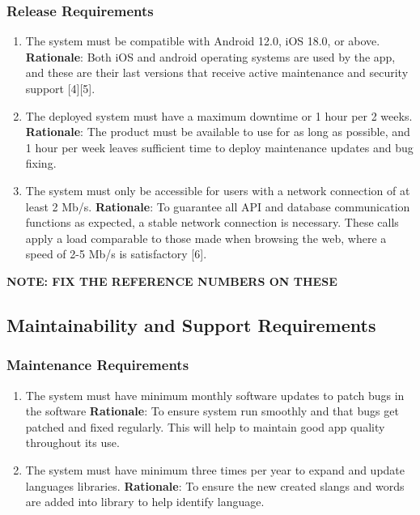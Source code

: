 \subsubsection{Release Requirements}
\label{ssub:release_requirements}
\begin{enumerate}[{OE-R}1. ]
	\item The system must be compatible with Android 12.0, iOS 18.0, or above.
	\textbf{Rationale}: Both iOS and android operating systems are used by the app, and these are their last versions that receive active maintenance and security support [4][5]. 
	\item The deployed system must have a maximum downtime or 1 hour per 2 weeks.
	\textbf{Rationale}: The product must be available to use for as long as possible, and 1 hour per week leaves sufficient time to deploy maintenance updates and bug fixing.
	\item The system must only be accessible for users with a network connection of at least 2 Mb/s.
	\textbf{Rationale}: To guarantee all API and database communication functions as expected, a stable network connection is necessary. These calls apply a load comparable to those made when browsing the web, where a speed of 2-5 Mb/s is satisfactory [6].
\end{enumerate}

\textbf{NOTE: FIX THE REFERENCE NUMBERS ON THESE}


\subsection{Maintainability and Support Requirements}
\label{sub:maintainability_and_support_requirements}

\subsubsection{Maintenance Requirements}
\label{ssub:maintenance_requirements}
\begin{enumerate}[{MS-M}1. ]
	\item The system must have minimum monthly software updates to patch bugs in the software  
	\textbf{Rationale}: To ensure system 	run smoothly and that bugs get patched and fixed regularly. This will help to maintain 	good app quality throughout its use.
	\item The system must have minimum three times per year to expand and update languages libraries. 
	\textbf{Rationale}: To ensure the new created slangs and words are added into library to help identify language.
\end{enumerate}

